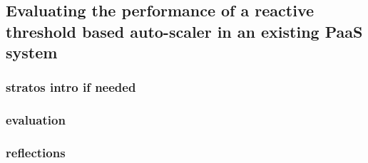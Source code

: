 \subsection{Evaluating the performance of a reactive threshold based auto-scaler in an existing PaaS system}

\subsubsection{stratos intro if needed}
\subsubsection{evaluation}



\subsubsection{reflections}
